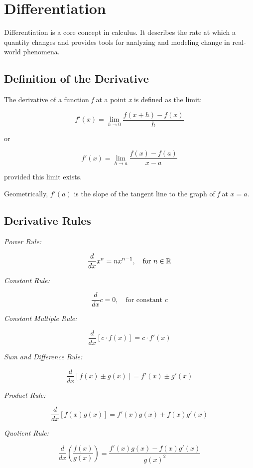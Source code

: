 \newpage
\section{Differentiation}

Differentiation is a core concept in calculus. It describes the rate at which a quantity changes 
and provides tools for analyzing and modeling change in real-world phenomena.

\subsection{Definition of the Derivative}

The derivative of a function \emph{f} at a point \emph{x} is defined as the limit:

\[
    f'(x) = \lim_{h \to 0} \frac{f(x + h) - f(x)}{h}
\]

or

\[
    f'(x) = \lim_{h \to a}\frac{f(x) - f(a)}{x - a}
\]

provided this limit exists.
\vspace{\baselineskip}

Geometrically, \(f'(a)\) is the slope of the tangent line to the graph of \emph{f} at \(x = a\).

\subsection{Derivative Rules}

\emph{Power Rule:}

\[
    \frac{d}{dx} x^n = nx^{n - 1}, \quad \text{for } n \in \mathbb{R}
\]

\emph{Constant Rule:}

\[
    \frac{d}{dx} c = 0, \quad \text{for constant } c
\]

\emph{Constant Multiple Rule:}

\[
    \frac{d}{dx} [c \cdot f(x)] = c \cdot f'(x)
\]

\emph{Sum and Difference Rule:}

\[
    \frac{d}{dx} [f(x) \pm g(x)] = f'(x) \pm g'(x)
\]

\emph{Product Rule:}

\[
    \frac{d}{dx} [f(x)g(x)] = f'(x)g(x) + f(x)g'(x)
\]

\emph{Quotient Rule:}

\[
    \frac{d}{dx} \left( \frac{f(x)}{g(x)} \right) = \frac{f'(x)g(x) - f(x)g'(x)}{{g(x)}^2}
\]

